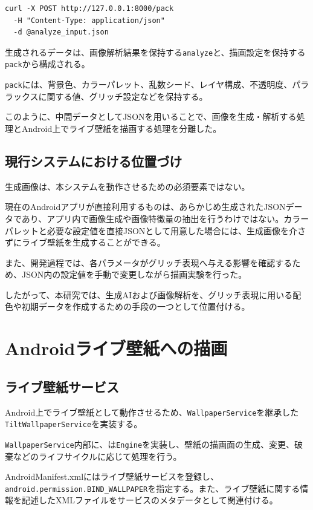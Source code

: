 \begin{verbatim}
curl -X POST http://127.0.0.1:8000/pack 
  -H "Content-Type: application/json" 
  -d @analyze_input.json
\end{verbatim}

生成されるデータは、画像解析結果を保持する\texttt{analyze}と、描画設定を保持する\texttt{pack}から構成される。

\texttt{pack}には、背景色、カラーパレット、乱数シード、レイヤ構成、不透明度、パララックスに関する値、グリッチ設定などを保持する。

このように、中間データとしてJSONを用いることで、画像を生成・解析する処理とAndroid上でライブ壁紙を描画する処理を分離した。


\subsection{現行システムにおける位置づけ}

生成画像は、本システムを動作させるための必須要素ではない。

現在のAndroidアプリが直接利用するものは、あらかじめ生成されたJSONデータであり、アプリ内で画像生成や画像特徴量の抽出を行うわけではない。カラーパレットと必要な設定値を直接JSONとして用意した場合には、生成画像を介さずにライブ壁紙を生成することができる。

また、開発過程では、各パラメータがグリッチ表現へ与える影響を確認するため、JSON内の設定値を手動で変更しながら描画実験を行った。

したがって、本研究では、生成AIおよび画像解析を、グリッチ表現に用いる配色や初期データを作成するための手段の一つとして位置付ける。


\section{Androidライブ壁紙への描画}

\subsection{ライブ壁紙サービス}

Android上でライブ壁紙として動作させるため、\texttt{WallpaperService}を継承した\texttt{TiltWallpaperService}を実装する。

\texttt{WallpaperService}内部に、は\texttt{Engine}を実装し、壁紙の描画面の生成、変更、破棄などのライフサイクルに応じて処理を行う。

AndroidManifest.xmlにはライブ壁紙サービスを登録し、\texttt{android.permission.BIND\_WALLPAPER}を指定する。また、ライブ壁紙に関する情報を記述したXMLファイルをサービスのメタデータとして関連付ける。

